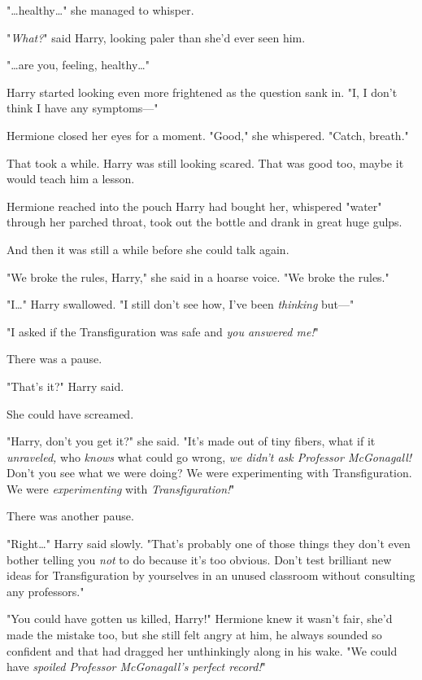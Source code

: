 "{\ldots}healthy{\ldots}" she managed to whisper.

"\emph{What?}" said Harry, looking paler than she'd ever seen him.

"{\ldots}are you, feeling, healthy{\ldots}"

Harry started looking even more frightened as the question sank in. "I, I don't 
think I have any symptoms---"

Hermione closed her eyes for a moment. "Good," she whispered. "Catch, breath."

That took a while. Harry was still looking scared. That was good too, maybe it 
would teach him a lesson.

Hermione reached into the pouch Harry had bought her, whispered "water" through 
her parched throat, took out the bottle and drank in great huge gulps.

And then it was still a while before she could talk again.

"We broke the rules, Harry," she said in a hoarse voice. "We broke the rules."

"I{\ldots}" Harry swallowed. "I still don't see how, I've been \emph{thinking} 
but---"

"I asked if the Transfiguration was safe and \emph{you answered me!}"

There was a pause.

"That's it?" Harry said.

She could have screamed.

"Harry, don't you get it?" she said. "It's made out of tiny fibers, what if it 
\emph{unraveled,} who \emph{knows} what could go wrong, \emph{we didn't ask 
Professor McGonagall!} Don't you see what we were doing? We were experimenting 
with Transfiguration. We were \emph{experimenting} with \emph{Transfiguration!}"

There was another pause.

"Right{\ldots}" Harry said slowly. "That's probably one of those things they 
don't even bother telling you \emph{not} to do because it's too obvious. Don't 
test brilliant new ideas for Transfiguration by yourselves in an unused 
classroom without consulting any professors."

"You could have gotten us killed, Harry!" Hermione knew it wasn't fair, she'd 
made the mistake too, but she still felt angry at him, he always sounded so 
confident and that had dragged her unthinkingly along in his wake. "We could 
have \emph{spoiled Professor McGonagall's perfect record!}"

